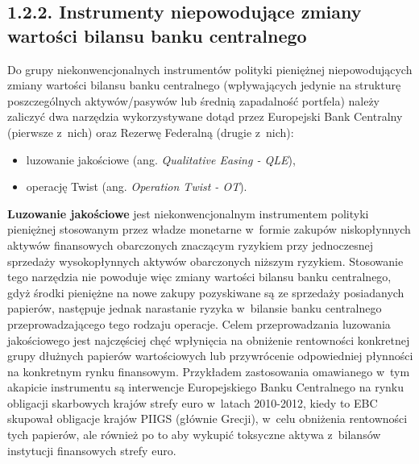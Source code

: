 \hypertarget{podroz112}{}
\subsection*{\large{1.2.2. Instrumenty niepowodujące zmiany wartości bilansu banku centralnego}}

Do grupy niekonwencjonalnych instrumentów polityki pieniężnej niepowodujących zmiany wartości bilansu banku centralnego (wpływających jedynie na strukturę poszczególnych aktywów/pasywów lub średnią zapadalność portfela) należy zaliczyć dwa narzędzia wykorzystywane dotąd przez Europejski Bank Centralny (pierwsze z~nich) oraz Rezerwę Federalną (drugie z~nich):

\begin{itemize}
\setlength\itemsep{0.05cm}
\item luzowanie jakościowe (ang. \textit{Qualitative Easing - QLE}),
\item operację Twist (ang. \textit{Operation Twist - OT}).
\end{itemize}

\textbf{Luzowanie jakościowe} jest niekonwencjonalnym instrumentem polityki pieniężnej stosowanym przez władze monetarne w~formie zakupów niskopłynnych aktywów finansowych obarczonych znaczącym ryzykiem przy jednoczesnej sprzedaży wysokopłynnych aktywów obarczonych niższym ryzykiem. Stosowanie tego narzędzia nie powoduje więc zmiany wartości bilansu banku centralnego, gdyż środki pieniężne na nowe zakupy pozyskiwane są ze sprzedaży posiadanych papierów, następuje jednak narastanie ryzyka w~bilansie banku centralnego przeprowadzającego tego rodzaju operacje. Celem przeprowadzania luzowania jakościowego jest najczęściej chęć wpłynięcia na obniżenie rentowności konkretnej grupy dłużnych papierów wartościowych lub przywrócenie odpowiedniej płynności na konkretnym rynku finansowym. Przykładem zastosowania omawianego w~tym akapicie instrumentu są interwencje Europejskiego Banku Centralnego na rynku obligacji skarbowych krajów strefy euro w~latach 2010-2012, kiedy to \acs{EBC} skupował obligacje krajów \acs{PIIGS} (głównie Grecji), w~celu obniżenia rentowności tych papierów, ale również po to aby wykupić toksyczne aktywa z~bilansów instytucji finansowych strefy euro\cite{bagus23}.

